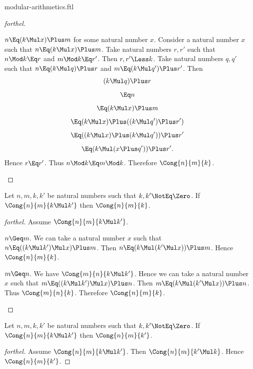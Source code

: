 \documentclass{stex}
\begin{document}
\begin{smodule}{modular-arithmetics.ftl}
\begin{proof}[forthel]
  \begin{case}{$n \Eq (k \Mul x) \Plus m$ for some natural number $x$.}
    Consider a natural number $x$ such that $n \Eq (k \Mul x) \Plus m$.
    Take natural numbers $r, r'$ such that $n \Mod k \Eq r$ and $m \Mod k \Eq r'$.
    Then $r, r' \Less k$.
    Take natural numbers $q, q'$ such that $n \Eq (k \Mul q) \Plus r$ and $m \Eq (k \Mul q') \Plus r'$.
    Then
    \[  (k \Mul q) \Plus r                         \]
    \[    \Eq n                                   \]
    \[    \Eq (k \Mul x) \Plus m                     \]
    \[    \Eq (k \Mul x) \Plus ((k \Mul q') \Plus r')   \]
    \[    \Eq ((k \Mul x) \Plus (k \Mul q')) \Plus r'   \]
    \[    \Eq (k \Mul (x \Plus q')) \Plus r'.            \]
    Hence $r \Eq r'$.
    Thus $n \Mod k \Eq m \Mod k$.
    Therefore $\Cong{n}{m}{k}$.
  \end{case}
\end{proof}

\begin{proposition*}[forthel]
  Let $n, m, k, k'$ be natural numbers such that $k, k' \NotEq \Zero$.
  If $\Cong{n}{m}{k \Mul k'}$ then $\Cong{n}{m}{k}$.
\end{proposition*}
\begin{proof}[forthel]
  Assume $\Cong{n}{m}{k \Mul k'}$.

  \begin{case}{$n \Geq m$.}
    We can take a natural number $x$ such that $n \Eq ((k \Mul k') \Mul x) \Plus m$.
    Then $n \Eq (k \Mul (k' \Mul x)) \Plus m$.
    Hence $\Cong{n}{m}{k}$.
  \end{case}

  \begin{case}{$m \Geq n$.}
    We have $\Cong{m}{n}{k \Mul k'}$.
    Hence we can take a natural number $x$ such that $m \Eq ((k \Mul k') \Mul x) \Plus n$.
    Then $m \Eq (k \Mul (k' \Mul x)) \Plus n$.
    Thus $\Cong{m}{n}{k}$.
    Therefore $\Cong{n}{m}{k}$.
  \end{case}
\end{proof}

\begin{proposition*}[forthel]
  Let $n, m, k, k'$ be natural numbers such that $k, k' \NotEq \Zero$.
  If $\Cong{n}{m}{k \Mul k'}$ then $\Cong{n}{m}{k'}$.
\end{proposition*}
\begin{proof}[forthel]
  Assume $\Cong{n}{m}{k \Mul k'}$.
  Then $\Cong{n}{m}{k' \Mul k}$.
  Hence $\Cong{n}{m}{k'}$.
\end{proof}


\end{smodule}
\end{document}
